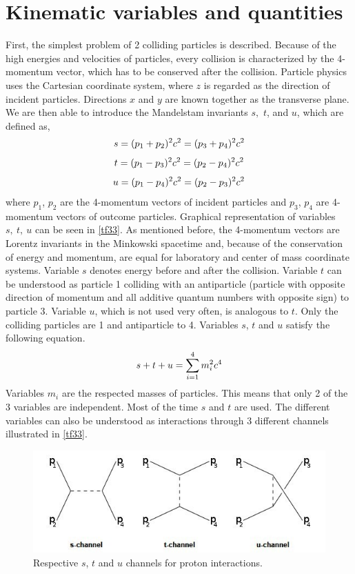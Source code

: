 \section{Kinematic variables and quantities}
First, the simplest problem of 2 colliding particles is described. Because of the high energies and velocities of particles, every collision is characterized by the 4-momentum vector, which has to be conserved after the collision. Particle physics uses the Cartesian coordinate system, where $z$ is regarded as the direction of incident particles. Directions $x$ and $y$ are known together as the transverse plane. We are then able to introduce the Mandelstam invariants $s,$ $t$, and $u$, which are defined as,
\begin{equation}
\centering
s = (p_1 + p_2)^2 c^2 = (p_3 + p_4)^2 c^2
\label{t4}
\end{equation}
\begin{equation}
\centering
t = (p_1 - p_3)^2 c^2 = (p_2 - p_4)^2 c^2
\label{t5}
\end{equation}
\begin{equation}
\centering
u = (p_1 - p_4)^2 c^2 = (p_2 - p_3)^2 c^2
\label{t6}
\end{equation}
where $p_1$, $p_2$ are the 4-momentum vectors of incident particles and $p_3$, $p_4$ are 4-momentum vectors of outcome particles. Graphical representation of variables $s,~t,~u$ can be seen in \autoref{tf33}. As mentioned before, the 4-momentum vectors are Lorentz invariants in the Minkowski spacetime and, because of the conservation of energy and momentum, are equal for laboratory and center of mass coordinate systems. Variable $s$ denotes energy before and after the collision. Variable $t$ can be understood as particle 1 colliding with an antiparticle (particle with opposite direction of momentum and all additive quantum numbers with opposite sign) to particle 3. Variable $u$, which is not used very often, is analogous to $t$. Only the colliding particles are 1 and antiparticle to 4. Variables $s$, $t$ and $u$ satisfy the following equation.
\begin{equation}
\centering
s + t + u = \sum_{i=1}^4 m_i^2c^4
\label{t7}
\end{equation}
Variables $m_i$ are the respected masses of particles. This means that only 2 of the 3 variables are independent. Most of the time $s$ and $t$ are used. The different variables can also be understood as interactions through 3 different channels illustrated in \autoref{tf33}.
\FloatBarrier
\begin{figure}[ht]
    \centering
    \includegraphics[width=1\textwidth]{figures/stu.jpg}
    \caption[Particle interactions through $s$, $t$, and $u$ channels]{Respective $s$, $t$ and $u$ channels for proton interactions.}
    \label{tf33}
\end{figure}
